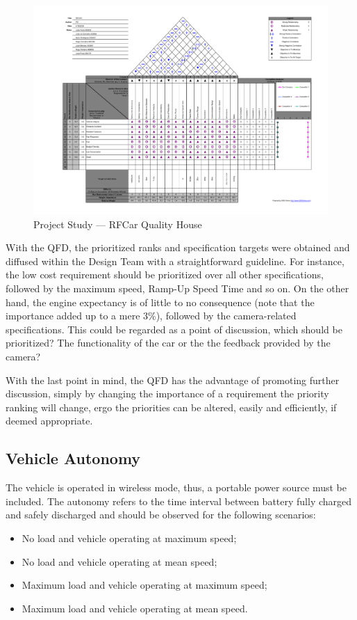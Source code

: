 \begin{figure}
   \centering
       \includegraphics[page=1,width=1.0\textwidth]{sec/pdf/QFDv3.pdf} 
 \caption{Project Study --- RFCar Quality House}%
\label{fig:QFD}
\end{figure}
%
With the QFD, the prioritized ranks and specification targets were obtained and diffused within the Design Team with a
straightforward guideline. For instance, the low cost requirement should be
prioritized over all other specifications, followed by the maximum speed,
Ramp-Up Speed Time and so on.  On the other hand, the engine expectancy is of
little to no consequence (note that the importance added up to a mere 3\%),
followed by the camera-related specifications. This could be regarded as
a point of discussion, which should be prioritized? The functionality of the car
or the the feedback provided by the camera?

With the last point in mind, the QFD has the advantage of promoting further
discussion, simply by changing the importance of a requirement the priority ranking will change, ergo
the priorities can be altered, easily and efficiently, if deemed appropriate.
\newpage
%
\subsection{Vehicle Autonomy}%
\label{sec:autonomy-specs}
The vehicle is operated in wireless mode, thus, a portable power source must be included. The autonomy refers to the time interval between battery fully charged and safely discharged and should be observed for the following scenarios:
\begin{itemize}
\item No load and vehicle operating at maximum speed;
\item No load and vehicle operating at mean speed;
\item Maximum load and vehicle operating at maximum speed;
\item Maximum load and vehicle operating at mean speed.
\end{itemize}
